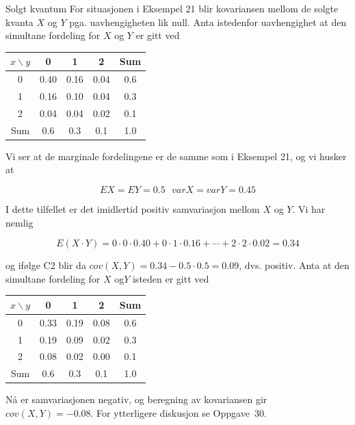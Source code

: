 \begin{eksempel}{Solgt kvantum}
For situasjonen i Eksempel 21 blir kovariansen mellom de solgte
kvanta $X$ og $Y$ pga. uavhengigheten lik null. Anta istedenfor
uavhengighet at den simultane fordeling for $X$ og $Y$ er gitt
ved

\begin{center}
 \begin{tabular}{|c|ccc|c|} \hline                                       
 $x\backslash y$ & 0 & 1 & 2 & Sum \\ \hline
  0  & 0.40 & 0.16 & 0.04 & 0.6 \\
  1  & 0.16 & 0.10 & 0.04 & 0.3 \\
  2  & 0.04 & 0.04 & 0.02 & 0.1 \\ \hline
 Sum & 0.6 & 0.3 & 0.1 & 1.0  \\ \hline
 \end{tabular} \end{center}

\noindent Vi ser at de marginale fordelingene er de samme som i Eksempel
21, og vi husker at

\[    EX=EY=0.5 \mbox{\ \ \ \ } varX=varY=0.45  \]

\noindent I dette tilfellet er det imidlertid positiv samvariasjon mellom
$X$ og $Y$. Vi har nemlig

\[ E(X\cdot Y)=0\cdot 0\cdot 0.40+0\cdot 1\cdot 0.16+\cdots +2\cdot
                                        2\cdot 0.02=0.34 \]

\noindent og ifølge C2 blir da $cov(X,Y)=0.34-0.5\cdot 0.5=0.09$, dvs.
positiv. Anta at den simultane fordeling for $X$ og$Y$ isteden er
gitt ved

\begin{center}
 \begin{tabular}{|c|ccc|c|} \hline
 $x\backslash y$ & 0 & 1 & 2 & Sum \\ \hline
  0  & 0.33 & 0.19 & 0.08 & 0.6 \\
  1  & 0.19 & 0.09 & 0.02 & 0.3 \\
  2  & 0.08 & 0.02 & 0.00 & 0.1 \\ \hline
 Sum & 0.6 & 0.3 & 0.1 & 1.0 \\ \hline
 \end{tabular} \end{center}

\noindent Nå er samvariasjonen negativ, og beregning av kovariansen gir
$cov(X,Y)=-0.08$. For ytterligere diskusjon se Oppgave~30.
\end{eksempel}

